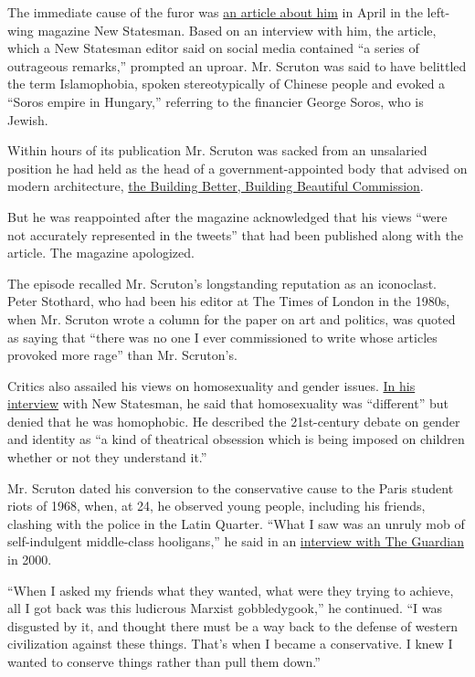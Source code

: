 The immediate cause of the furor was
\href{https://www.newstatesman.com/politics/uk/2019/04/roger-scruton-interview-full-transcript}{an
article about him} in April in the left-wing magazine New Statesman.
Based on an interview with him, the article, which a New Statesman
editor said on social media contained ``a series of outrageous
remarks,'' prompted an uproar. Mr. Scruton was said to have belittled
the term Islamophobia, spoken stereotypically of Chinese people and
evoked a ``Soros empire in Hungary,'' referring to the financier George
Soros, who is Jewish.

Within hours of its publication Mr. Scruton was sacked from an
unsalaried position he had held as the head of a government-appointed
body that advised on modern architecture,
\href{https://www.gov.uk/government/groups/building-better-building-beautiful-commission}{the
Building Better, Building Beautiful Commission}.

But he was reappointed after the magazine acknowledged that his views
``were not accurately represented in the tweets'' that had been
published along with the article. The magazine apologized.

The episode recalled Mr. Scruton's longstanding reputation as an
iconoclast. Peter Stothard, who had been his editor at The Times of
London in the 1980s, when Mr. Scruton wrote a column for the paper on
art and politics, was quoted as saying that ``there was no one I ever
commissioned to write whose articles provoked more rage'' than Mr.
Scruton's.

Critics also assailed his views on homosexuality and gender issues.
\href{https://www.newstatesman.com/politics/uk/2019/04/roger-scruton-interview-full-transcript}{In
his interview} with New Statesman, he said that homosexuality was
``different'' but denied that he was homophobic. He described the
21st-century debate on gender and identity as ``a kind of theatrical
obsession which is being imposed on children whether or not they
understand it.''

Mr. Scruton dated his conversion to the conservative cause to the Paris
student riots of 1968, when, at 24, he observed young people, including
his friends, clashing with the police in the Latin Quarter. ``What I saw
was an unruly mob of self-indulgent middle-class hooligans,'' he said in
an
\href{https://www.theguardian.com/books/2000/oct/28/politics}{interview
with The Guardian} in 2000.

``When I asked my friends what they wanted, what were they trying to
achieve, all I got back was this ludicrous Marxist gobbledygook,'' he
continued. ``I was disgusted by it, and thought there must be a way back
to the defense of western civilization against these things. That's when
I became a conservative. I knew I wanted to conserve things rather than
pull them down.''


